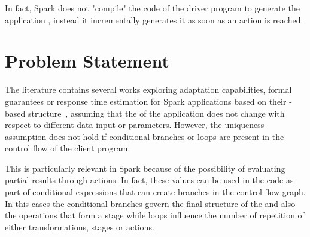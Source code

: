 In fact, Spark does not "compile" the code of the driver program to generate the application \plan, instead it incrementally generates it as soon as an action is reached.

\section{Problem Statement}\label{sec:problem_statement}

The literature contains several works exploring adaptation capabilities, formal guarantees or response time estimation for Spark applications based on their \plan-based structure~\cite{dSpark, xsparkreport, Quattrocchi2018}, assuming that the \plan of the application does not change with respect to different data input or parameters. However, the \plan uniqueness assumption does not hold if conditional branches or loops are present in the control flow of the client program.

This is particularly relevant in Spark because of the possibility of evaluating partial results through actions. In fact, these values can be used in the code as part of conditional expressions that can create branches in the control flow graph. In this cases the conditional branches govern the final structure of the \plan and also the operations that form a stage while loops influence the number of repetition of either transformations, stages or actions. 


